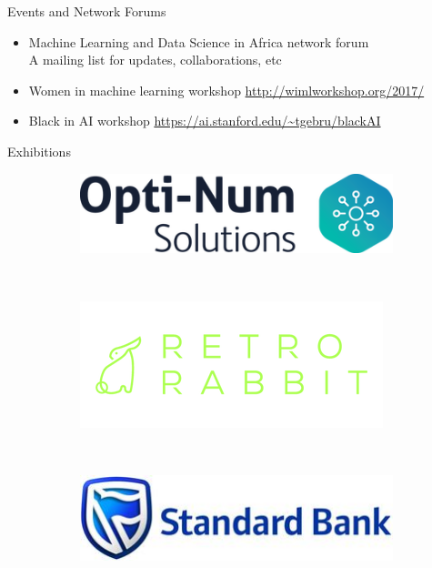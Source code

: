 \documentclass{beamer}
\begin{document}
\begin{frame}{Events and Network Forums}
	
	\begin{itemize}[<+->]
	\item Machine Learning and Data Science in Africa network forum\\
	A mailing list for updates, collaborations, etc
	\item Women in machine learning workshop \url{http://wimlworkshop.org/2017/}
	
	\item Black in AI workshop 
	\url{https://ai.stanford.edu/~tgebru/blackAI}
	\end{itemize} 
	
\end{frame}
\begin{frame}{Exhibitions}		
	\begin{figure}
		\begin{subfigure}[b]{0.40\textwidth}
				\includegraphics[width=\textwidth]{opti-num.png}
		\end{subfigure}~
	     \hspace*{2cm}
		\begin{subfigure}[b]{0.30\textwidth}
				\includegraphics[width=\textwidth]{retrorabbit.png}
		\end{subfigure}\\
	    \vspace*{2cm}
	    \begin{subfigure}[b]{0.35\textwidth}
		\includegraphics[width=\textwidth]{standardbank.jpg}

\end{subfigure}
\end{figure}
\end{frame}
\end{document}
